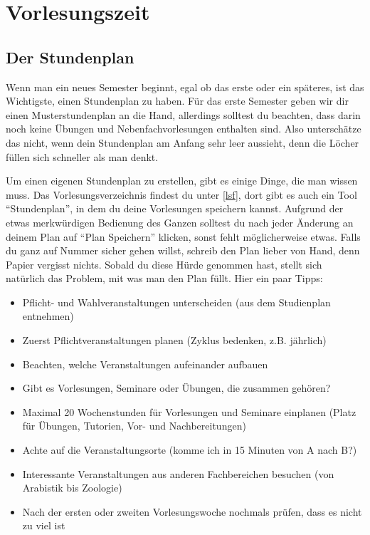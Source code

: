 ﻿\chapter{Vorlesungszeit}

\section{Der Stundenplan}

Wenn man ein neues Semester beginnt, egal ob das erste oder ein späteres, ist das Wichtigste, einen Stundenplan zu haben. Für das erste Semester geben wir dir einen Musterstundenplan an die Hand, allerdings solltest du beachten, dass darin noch keine Übungen und Nebenfachvorlesungen enthalten sind. Also unterschätze das nicht, wenn dein Stundenplan am Anfang sehr leer aussieht, denn die Löcher füllen sich schneller als man denkt.

Um einen eigenen Stundenplan zu erstellen, gibt es einige Dinge, die man wissen muss. Das Vorlesungsverzeichnis findest du unter \ref{lsf}, dort gibt es auch ein Tool ``Stundenplan'', in dem du deine Vorlesungen speichern kannst. Aufgrund der etwas merkwürdigen Bedienung des Ganzen solltest du nach jeder Änderung an deinem Plan auf ``Plan Speichern'' klicken, sonst fehlt möglicherweise etwas. Falls du ganz auf Nummer sicher gehen willst, schreib den Plan lieber von Hand, denn Papier vergisst nichts. Sobald du diese Hürde genommen hast, stellt sich natürlich das Problem, mit was man den Plan füllt. Hier ein paar Tipps:

\begin{itemize}
	\item Pflicht- und Wahlveranstaltungen unterscheiden (aus dem Studienplan entnehmen)
	\item Zuerst Pflichtveranstaltungen planen (Zyklus bedenken, z.B. jährlich)
	\item Beachten, welche Veranstaltungen aufeinander aufbauen
	\item Gibt es Vorlesungen, Seminare oder Übungen, die zusammen gehören?
	\item Maximal 20 Wochenstunden für Vorlesungen und Seminare einplanen (Platz für Übungen, Tutorien, Vor- und Nachbereitungen)
	\item Achte auf die Veranstaltungsorte (komme ich in 15 Minuten von A nach B?)
	\item Interessante Veranstaltungen aus anderen Fachbereichen besuchen (von Arabistik bis Zoologie)
	\item Nach der ersten oder zweiten Vorlesungswoche nochmals prüfen, dass es nicht zu viel ist
\end{itemize}

